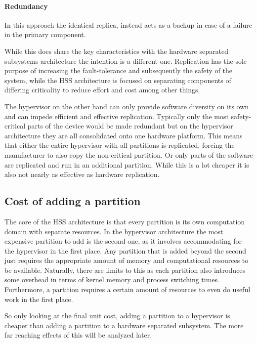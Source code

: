 \paragraph{Redundancy} In this approach the identical replica, instead acts as a backup in case of a failure in the primary component.

While this does share the key characteristics with the hardware separated subsystems architecture the intention is a different one. 
Replication has the sole purpose of increasing the fault-tolerance and subsequently the safety of the system, while the \gls{HSS} architecture is focused on separating components of differing criticality to reduce effort and cost among other things.

The hypervisor on the other hand can only provide software diversity on its own and can impede efficient and effective replication. Typically only the most safety-critical parts of the device would be made redundant but on the hypervisor architecture they are all consolidated onto one hardware platform. This means that either the entire hypervisor with all partitions is replicated, forcing the manufacturer to also copy the non-critical partition. Or only parts of the software are replicated and run in an additional partition. While this is a lot cheaper it is also not nearly as effective as hardware replication.
\subsection{Cost of adding a partition}
The core of the \gls{HSS} architecture is that every partition is its own computation domain with separate resources. In the hypervisor architecture the most expensive partition to add is the second one, as it involves accommodating for the hypervisor in the first place. Any partition that is added beyond the second just requires the appropriate amount of memory and computational resources to be available. Naturally, there are limits to this as each partition also introduces some overhead in terms of kernel memory and process switching times.  Furthermore, a partition requires a certain amount of resources to even do useful work in the first place.


So only looking at the final unit cost, adding a partition to a hypervisor is cheaper than adding a partition to a hardware separated subsystem. The more far reaching effects of this will be analyzed later.


